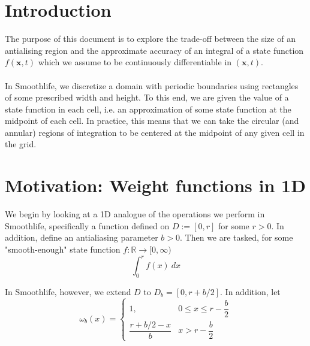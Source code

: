 \documentclass{article}
\begin{document}
    
\section*{Introduction}

The purpose of this document is to explore the trade-off between the size of an antialising region
and the approximate accuracy of an integral of a state function $f(\mathbf{x}, t)$ which we assume
to be continuously differentiable in $(\mathbf{x}, t)$.
\\
\\
In Smoothlife, we discretize a domain with periodic boundaries using rectangles of some prescribed width and height. To this end, we are given the value of a state function in each cell, i.e. an approximation of some state function at the midpoint of each cell. In practice, this means that we can take the circular (and annular) regions of integration to be centered at the midpoint of any given cell in the grid.
    
\section{Motivation: Weight functions in 1D}

We begin by looking at a 1D analogue of the operations we perform in Smoothlife, specifically a function defined on $D := [0, r]$ for some $r > 0$. In addition, define an antialiasing parameter $b > 0$. Then we are tasked, for some "smooth-enough" state function $f : \mathbb{R} \rightarrow [0, \infty)$
\[
    \int_0^r f(x) \: dx
\]

\noindent
In Smoothlife, however, we extend $D$ to $D_b = [0, r + b/2]$. In addition, let
\[
    \omega_b(x)=
    \begin{cases}
        1, & 0 \leq x \leq r - \dfrac{b}{2} \\
        \dfrac{r + b/2 - x}{b} & x > r - \dfrac{b}{2}
    \end{cases}
\]

\begin{figure}[h]
    \centering
\end{figure}
\end{document}
